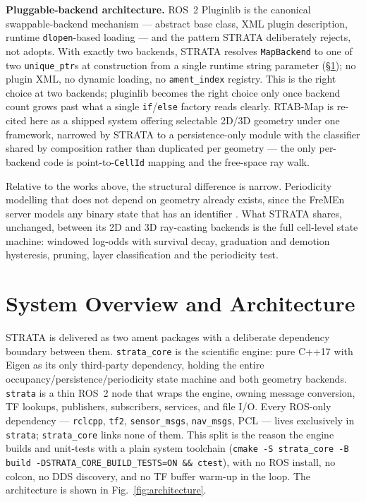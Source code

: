 \documentclass[conference]{IEEEtran}
\begin{document}
\textbf{Pluggable-backend architecture.} ROS~2 Pluginlib \cite{ros2pluginlib} is the
canonical swappable-backend mechanism --- abstract base class, XML plugin
description, runtime \texttt{dlopen}-based loading --- and the pattern STRATA
deliberately rejects, not adopts. With exactly two backends, STRATA resolves
\texttt{MapBackend} to one of two \texttt{unique\_ptr}s at construction from a single
runtime string parameter (\S\ref{sec:system}); no plugin XML, no dynamic loading, no
\texttt{ament\_index} registry. This is the right choice at two backends; pluginlib
becomes the right choice only once backend count grows past what a single
\texttt{if}/\texttt{else} factory reads clearly. RTAB-Map \cite{labbe2019rtabmap} is re-cited
here as a shipped system offering selectable 2D/3D geometry under one
framework, narrowed by STRATA to a persistence-only
module with the classifier shared by composition rather than duplicated per
geometry --- the only per-backend code is point-to-\texttt{CellId} mapping and the
free-space ray walk.

Relative to the works above, the structural difference is narrow.
Periodicity modelling that does not depend on geometry already exists, since
the FreMEn server models any binary state that has an identifier
\cite{fremenrepo}. What STRATA shares, unchanged, between its 2D and 3D
ray-casting backends is the full cell-level state machine: windowed log-odds
with survival decay, graduation and demotion hysteresis, pruning, layer
classification and the periodicity test.

\section{System Overview and Architecture}
\label{sec:system}

STRATA is delivered as two ament packages with a deliberate dependency
boundary between them. \texttt{strata\_core} is the scientific engine: pure C++17 with
Eigen as its only third-party dependency, holding the entire
occupancy/persistence/periodicity state machine and both geometry backends.
\texttt{strata} is a thin ROS~2 node that wraps the engine, owning message
conversion, TF lookups, publishers, subscribers, services, and file I/O. Every
ROS-only dependency --- \texttt{rclcpp}, \texttt{tf2}, \texttt{sensor\_msgs}, \texttt{nav\_msgs}, PCL --- lives
exclusively in \texttt{strata}; \texttt{strata\_core} links none of them. This split is the
reason the engine builds and unit-tests with a plain system toolchain
(\texttt{cmake -S strata\_core -B build -DSTRATA\_CORE\_BUILD\_TESTS=ON \&\& ctest}), with
no ROS install, no colcon, no DDS discovery, and no TF buffer warm-up in the
loop. The architecture is shown in Fig.~\ref{fig:architecture}.
\end{document}
